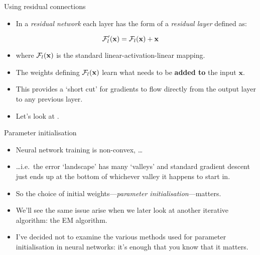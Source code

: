 \documentclass[10pt]{beamer}
\begin{document}
\begin{titledslide}{Using residual connections}

  \begin{itemize}
  \item In a \emph{residual network} each layer has the form of a
    \emph{residual layer} defined as:
  \end{itemize}

  \[
    {\cal F}'_{l}(\mathbf{x}) = {\cal F}_{l}(\mathbf{x}) + \mathbf{x} 
  \]

  \begin{itemize}
  \item where ${\cal F}_{l}(\mathbf{x})$ is the standard
    linear-activation-linear mapping.
  \item The weights defining ${\cal F}_{l}(\mathbf{x})$ learn what
    needs to be \textbf{added to} the input $\mathbf{x}$.
  \item This provides a `short cut' for gradients to flow directly
    from the output layer to any previous layer.
  \item Let's look at \cite[Fig~13.15]{pml1Book}.
  \end{itemize}
  
\end{titledslide}
\begin{titledslide}{Parameter initialisation}

  \begin{itemize}
  \item Neural network training is non-convex, \dots
  \item \dots i.e.\ the error `landscape' has many `valleys' and standard
    gradient descent just ends up at the bottom of whichever valley it
    happens to start in.
  \item So the choice of initial weights---\emph{parameter
      initialisation}---matters.
  \item We'll see the same issue arise when we later look at another
    iterative algorithm: the EM algorithm.
  \item I've decided not to examine the various methods used for
    parameter initialisation in neural networks: it's enough that you
    know that it matters.
  \end{itemize}
  
\end{titledslide}
\end{document}
